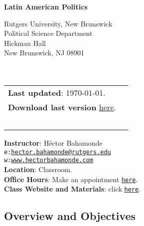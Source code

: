 \documentclass[letterpaper]{article}
\def\name{Latin American Politics}
\begin{document}

\centerline{\huge \bf \name}

\vspace{0.25in}

\begin{minipage}{0.45\linewidth}
  Rutgers University, New Brunswick \\
  Political Science Department \\
  Hickman Hall \\
  New Brunswick, NJ 08901\\
  \\
  \\

\end{minipage}
\hspace{4cm}\begin{minipage}{0.45\linewidth}
  \begin{tabular}{ll}
{\bf Last updated}: \today. \\
 {\bf Download last version} \href{https://github.com/hbahamonde/Latin_American_Politics_GRAD/raw/master/Bahamonde_Latin_American_Politics_Syllabus_GRAD.pdf}{here}.\\
   {\bf {\color{red}{\scriptsize Not intended as a definitive version}}} %
    \\
    \\
    \\
    \\
    \\
  \end{tabular}
\end{minipage}

\vspace{-5mm}
{\bf Instructor}: H\'ector Bahamonde\\
\texttt{e:}\href{mailto:hector.bahamonde@rutgers.edu}{\texttt{hector.bahamonde@rutgers.edu}}\\
\texttt{w:}\href{http://www.hectorbahamonde.com}{\texttt{www.hectorbahamonde.com}}\\
{\bf Location}: Classroom.\\
{\bf Office Hours}: Make an appointment \href{https://calendly.com/bahamonde/officehours}{\texttt{here}}.\\
{\bf Class Website and Materials}: click \href{https://github.com/hbahamonde/Latin_American_Politics_GRAD}{\texttt{here}}.

\subsection*{Overview and Objectives}
\end{document}
